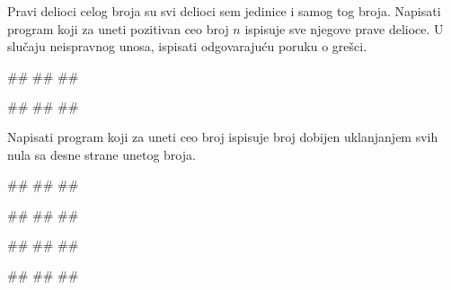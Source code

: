 \begin{Exercise}[label=PET_08] 
Pravi delioci celog broja su svi delioci sem jedinice i samog tog
broja. Napisati program koji za uneti pozitivan ceo broj $n$
ispisuje sve njegove prave delioce.
U slučaju neispravnog unosa, ispisati odgovarajuću poruku o grešci.

\begin{miditest}
\begin{upotreba}{1}
#\naslovInt#
##
##
\end{upotreba}
\end{miditest}
\begin{miditest}
\begin{upotreba}{2}
#\naslovInt#
##
##
\end{upotreba}
\end{miditest}
\end{Exercise}
\ifresenja
\begin{Answer}[ref=PET_08]
\end{Answer}
\fi


\begin{Exercise}[label=PET_09] 
Napisati program koji za uneti ceo broj ispisuje broj dobijen
uklanjanjem svih nula sa desne strane unetog broja.
 
\begin{miditest}
\begin{upotreba}{1}
#\naslovInt#
##
##
\end{upotreba}
\end{miditest}
\begin{miditest}
\begin{upotreba}{2}
#\naslovInt#
##
##
\end{upotreba}
\end{miditest}

\begin{miditest}
\begin{upotreba}{3}
#\naslovInt#
##
##
\end{upotreba}
\end{miditest}
\begin{miditest}
\begin{upotreba}{4}
#\naslovInt#
##
##
\end{upotreba}
\end{miditest}

\end{Exercise}
\ifresenja
\begin{Answer}[ref=PET_09]
\end{Answer}
\fi


